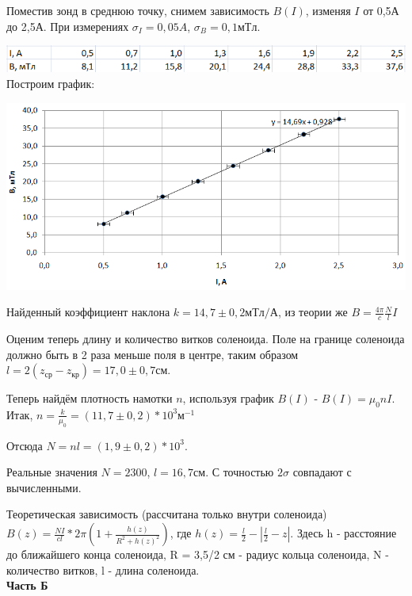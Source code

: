 \documentclass[12pt]{article}
\begin{document}
    Поместив зонд в среднюю точку, снимем зависимость $B(I)$, изменяя $I$ от 0,5А до 2,5А. При измерениях $\sigma_I = 0,05A$, $\sigma_B = 0,1мТл$.
    
    \begin{center}
    	\includegraphics[width=18cm]{table2.png}
    	\newpage
    	Построим график:
    	
    	\includegraphics[width=18cm]{graph2.png}
    \end{center}
    
    Найденный коэффициент наклона $k = 14,7 \pm 0,2 мТл/А$, из теории же $B = \frac{4\pi}{c}\frac{N}{l} I$
    
    Оценим теперь длину и количество витков соленоида. Поле на границе соленоида должно быть в 2 раза меньше поля в центре, таким образом $l = 2(z_{ср} - z_{кр}) = 17,0 \pm 0,7 см$. 
    
    Теперь найдём плотность намотки $n$, используя график $B(I)$ - $B(I) = \mu_0nI$. Итак, $n = \frac{k}{\mu_0} = (11,7 \pm 0,2) * 10^3 м^{-1}$
    
    Отсюда $N = nl = (1,9 \pm 0,2) * 10^3$.
    
    Реальные значения $N = 2300$, $l = 16,7 см$. С точностью $2\sigma$ совпадают с вычисленными.
    
    Теоретическая зависимость (рассчитана только внутри соленоида) $B(z) = \frac{NI}{cl}*2\pi (1 + \frac{h(z)}{R^2 + h(z)^2})$, где $h(z) = \frac{l}{2} - |\frac{l}{2} - z|$. Здесь h - расстояние до ближайшего конца соленоида, R = 3,5/2 см - радиус кольца соленоида, N - количество витков, l - длина соленоида.\\
    
    \textbf{\large Часть Б}
    \newline
    
\end{document}
